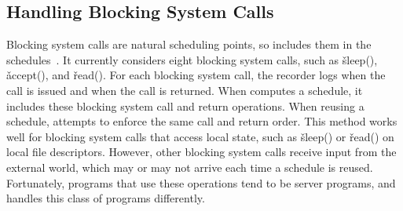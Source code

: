 




\subsection{Handling Blocking System Calls}

Blocking system calls are natural scheduling points, so \peregrine includes them
in the schedules~\cite{cui:tern:osdi10}.  It currently considers eight
blocking system calls, %
such as \v{sleep()},
\v{accept()}, and \v{read()}.  For each blocking system call, the recorder
logs when the call is issued and when the call is returned.  When \peregrine
computes a schedule, it includes these blocking system call and return
operations.  When reusing a schedule, \peregrine attempts to enforce the same
call and return order.  This method works well for blocking system calls
that access local state, such as \v{sleep()} or \v{read()} on local file
descriptors.  However, other blocking system calls receive input from
the external world, which may or may not arrive each time a
schedule is reused.  Fortunately, programs that use these operations tend to be
server programs, and \peregrine handles this class of programs differently.

